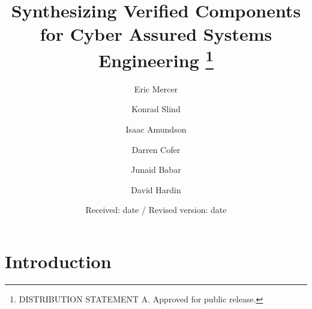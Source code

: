 \documentclass[global,twocolumn,keeplastbox]{svjour}
\newif\ifREVISIONS
\begin{document}
\title{
  Synthesizing Verified Components for Cyber Assured Systems Engineering
  \thanks{DISTRIBUTION STATEMENT A.  Approved for public release.}
}

\author{
  Eric Mercer    \and
  Konrad Slind   \and
  Isaac Amundson \and
  Darren Cofer   \and
  Junaid Babar   \and
  David Hardin
}


\date{Received: date / Revised version: date}

\maketitle

\begin{abstract}

\end{abstract}

\section{Introduction} \label{sec:intro}


\ifREVISIONS
\subsection{SOSYM Journal Details}
The due date is \textbf{March} $22^\mathrm{nd}$, \textbf{2022}.
Go to \url{https://mc.manuscriptcentral.com/sosym/}. Create a new account (if you don't have one), login and go to the "Author"-section, select the link "Start New Submission" under Author Dashboard and select "Special Section Paper" as the paper type, and choose "MODELS 2021 Special Issue". Also, make sure to mention the MODELS 2021 special issue in the cover letter.
\fi

\ifREVISIONS
\end{document}
